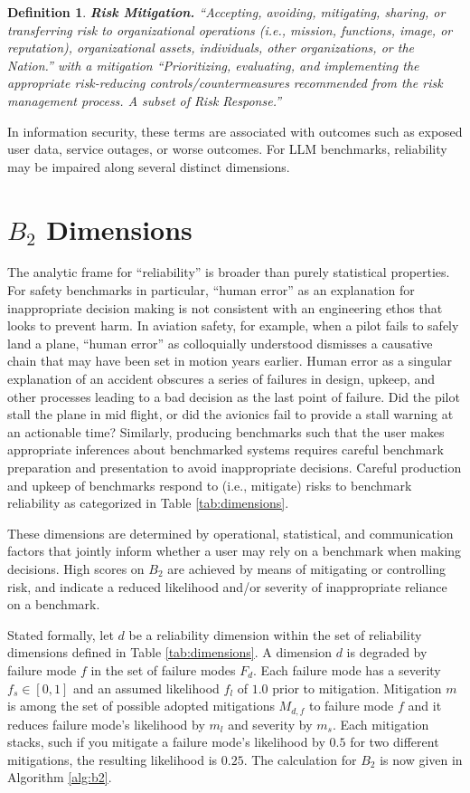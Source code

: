 \documentclass{article}
\newtheorem{dfn}{Definition}[section]
\newcommand\bb{$B_2$ }
\begin{document}
\begin{dfn}
{\bf Risk Mitigation.} ``Accepting, avoiding, mitigating, sharing, or transferring risk to organizational operations (i.e., mission, functions, image, or reputation), organizational assets, individuals, other organizations, or the Nation.'' \cite{joint2011sp} with a mitigation ``Prioritizing, evaluating, and implementing the appropriate risk-reducing controls/countermeasures recommended from the risk management process. A subset of Risk Response.'' \cite{cnssi4009}
\end{dfn}

In information security, these terms are associated with outcomes such as exposed user data, service outages, or worse outcomes. For LLM benchmarks, reliability may be impaired along several distinct dimensions.
\section{\texorpdfstring{\bb}{B2} Dimensions}
The analytic frame for ``reliability'' is broader than purely statistical properties. For safety benchmarks in particular, ``human error'' as an explanation for inappropriate decision making is not consistent with an engineering ethos that looks to prevent harm. In aviation safety, for example, when a pilot fails to safely land a plane, ``human error'' as colloquially understood dismisses a causative chain that may have been set in motion years earlier. Human error as a singular explanation of an accident obscures a series of failures in design, upkeep, and other processes leading to a bad decision as the last point of failure. Did the pilot stall the plane in mid flight, or did the avionics fail to provide a stall warning at an actionable time? Similarly, producing benchmarks such that the user makes appropriate inferences about benchmarked systems requires careful benchmark preparation and presentation to avoid inappropriate decisions. Careful production and upkeep of benchmarks respond to (i.e., mitigate) risks to benchmark reliability as categorized in Table \ref{tab:dimensions}.

These dimensions are determined by operational, statistical, and communication factors that jointly inform whether a user may rely on a benchmark when making decisions. High scores on \bb are achieved by means of mitigating or controlling risk, and indicate a reduced likelihood and/or severity of inappropriate reliance on a benchmark.

Stated formally, let $d$ be a reliability dimension within the set of reliability dimensions defined in Table \ref{tab:dimensions}. A dimension $d$ is degraded by failure mode $f$ in the set of failure modes  $F_d$. Each failure mode has a severity $f_s\in{[0,1]}$ and an assumed likelihood $f_l$ of $1.0$ prior to mitigation. Mitigation $m$ is among the set of possible adopted mitigations $M_{d,f}$ to failure mode $f$ and it reduces failure mode's likelihood by $m_l$ and severity by $m_s$. Each mitigation stacks, such if you mitigate a failure mode's likelihood by $0.5$ for two different mitigations, the resulting likelihood is $0.25$. The calculation for \bb is now given in Algorithm \ref{alg:b2}.
\end{document}
